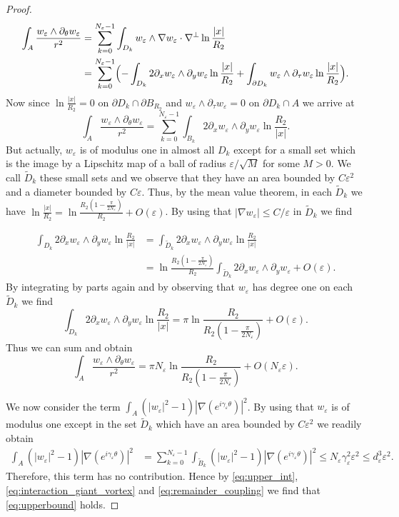 \documentclass[12pt,reqno]{amsart}
\def\e {{\varepsilon}}
\def \p {\partial}
\numberwithin{equation}{section}
\begin{document}
\begin{proof}
\begin{align*}
\int_{A} \frac{w_\e\wedge \p_\theta w_\e}{r^2} &=\sum_{k=0}^{N_\e-1} \int_{D_k} w_\e\wedge \nabla w_\e \cdot \nabla^\perp \ln\frac{|x|}{R_2} \\
&= \sum_{k=0}^{N_\e-1} \Bigl( -\int_{D_k} 2\p_x w_\e \wedge \p_y w_\e \ln\frac{|x|}{R_2} + \int_{\p D_k} w_\e\wedge \p_\tau w_\e \ln \frac{|x|}{R_2}\Bigr).
\end{align*}
Now since \(\ln \frac{|x|}{R_2} =0\) on \( \p D_k \cap \p B_{R_2}\) and \( w_\e\wedge \p_\tau w_\e=0\) on \(\p D_k \cap A\) we arrive at
\[\int_{A} \frac{w_\e\wedge \p_\theta w_\e}{r^2} = \sum_{k=0}^{N_\e-1}\int_{B_k} 2\p_x w_\e \wedge \p_y w_\e \ln\frac{R_2}{|x|}. \]
But actually, \(w_\e\) is of modulus one in almost all \(D_k\) except for a small set which is the image by a Lipschitz map of a ball of radius \(\e/\sqrt{M}\) for some \(M>0\). We call \(\tilde{D}_k\) these small sets and we observe that they have an area bounded by \(C\e^2\) and a diameter bounded by \(C\e\). Thus, by the mean value theorem, in each \(\tilde{D}_k\) we have \( \ln \frac{|x|}{R_2} =\ln \frac{R_2(1-\frac{\pi}{2N_\e})}{R_2} +O(\e)\). By using that \(|\nabla w_\e|\leq C/\e\) in \(\tilde{D}_k\) we find

\begin{align*}
\int_{D_k} 2\p_x w_\e \wedge \p_y w_\e \ln\frac{R_2}{|x|} &= \int_{\tilde{D}_k } 2\p_x w_\e \wedge \p_y w_\e \ln\frac{R_2}{|x|} \\
&= \ln \frac{R_2(1-\frac{\pi}{2N_\e})}{R_2}\int_{\tilde{D}_k} 2\p_x w_\e\wedge \p_yw_\e +O(\e).
\end{align*}
By integrating by parts again and by observing that \(w_\e\) has degree one on each \(\tilde{D}_k\) we find
\[ \int_{D_k} 2\p_x w_\e \wedge \p_y w_\e \ln\frac{R_2}{|x|} = \pi \ln \frac{R_2}{R_2(1-\frac{\pi}{2N_\e})}+O(\e).\]
Thus we can sum and obtain
\begin{equation}\label{eq:interaction_giant_vortex}
\int_{A} \frac{w_\e\wedge \p_\theta w_\e}{r^2} =\pi N_\e \ln \frac{R_2}{R_2(1-\frac{\pi}{2N_\e})}+O(N_\e \e).
\end{equation}

We now consider the term \(\int_{A} (|w_\e|^2-1)|\nabla (e^{i\gamma_\e \theta})|^2\). By using that \(w_\e\) is of modulus one except in the set \(\tilde{D}_k\) which have an area bounded by \(C\e^2\) we readily obtain
\begin{align}
\int_{A} (|w_\e|^2-1)|\nabla (e^{i\gamma_\e \theta})|^2&=\sum_{k=0}^{N_\e-1} \int_{\tilde{B}_k }(|w_\e|^2-1)|\nabla (e^{i\gamma_\e \theta})|^2  \leq N_\e \gamma_\e^2 \e^2 \leq d_\e^3\e^2. \label{eq:remainder_coupling}
\end{align} Therefore, this term has no contribution.
Hence by \eqref{eq:upper_int}, \eqref{eq:interaction_giant_vortex} and \eqref{eq:remainder_coupling} we find that \eqref{eq:upperbound} holds.

\end{proof}
\end{document}
